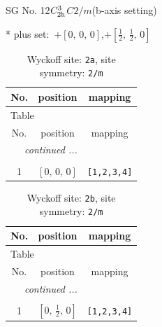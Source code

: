 \documentclass[fleqn,8pt]{jsarticle}
\begin{document}
\setcounter{MaxMatrixCols}{32}

\renewcommand{\tablename}{Table~}
\renewcommand{\figurename}{Figure~}
\begin{center}
\LARGE
SG No. 12\quad$C_{\rm 2h}^{3}$\quad$C2/m$\quad(b-axis setting)\quad[ monoclinic ]
\end{center}
* plus set:\,\,\,$+\left[ 0,\, 0,\, 0 \right]$,\quad $+\left[ \frac{1}{2},\, \frac{1}{2},\, 0 \right]$
\renewcommand{\arraystretch}{1.2}
\begin{longtable}{ccc}
\caption{Wyckoff site: {\tt 2a}, site symmetry: {\tt 2/m}}
 \\
 \hline \hline
No. & position & mapping \\ \hline \endfirsthead

\multicolumn{2}{l}{\tablename\ \thetable{}} \\
 \hline \hline
No. & position & mapping \\ \hline \endhead

 \hline \hline
\multicolumn{2}{r}{\footnotesize\it continued ...} \\ \endfoot

 \hline \hline
\multicolumn{2}{r}{} \\ \endlastfoot

1 & $\left[ 0,\, 0,\, 0 \right]$ & {\tt [1,2,3,4]} \\
\end{longtable}
\renewcommand{\arraystretch}{1.2}
\begin{longtable}{ccc}
\caption{Wyckoff site: {\tt 2b}, site symmetry: {\tt 2/m}}
 \\
 \hline \hline
No. & position & mapping \\ \hline \endfirsthead

\multicolumn{2}{l}{\tablename\ \thetable{}} \\
 \hline \hline
No. & position & mapping \\ \hline \endhead

 \hline \hline
\multicolumn{2}{r}{\footnotesize\it continued ...} \\ \endfoot

 \hline \hline
\multicolumn{2}{r}{} \\ \endlastfoot

1 & $\left[ 0,\, \frac{1}{2},\, 0 \right]$ & {\tt [1,2,3,4]} \\
\end{longtable}
\renewcommand{\arraystretch}{1.2}
\end{document}
